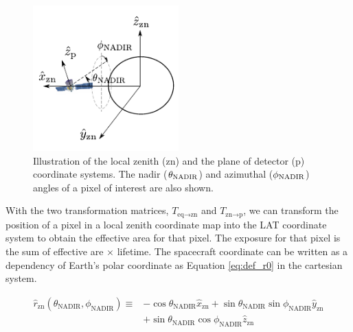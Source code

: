 \begin{figure}[h!]
    \centering
    \includegraphics[width=0.5\textwidth]{content/methodology/figures/fig_coordinate/coord_eq_p_v3.pdf}
    \caption{
        Illustration of the local zenith (zn) and the plane of detector
        (p) coordinate systems. The nadir ($\theta_{\rm NADIR}$)
        and azimuthal ($\phi_{\rm NADIR}$) angles of a pixel of
        interest are also shown.
    }
    \label{fig:coord_eq_p}
\end{figure}


With the two transformation matrices,
$T_{\text{eq}\rightarrow\text{zn}}$
and $T_{\text{zn}\rightarrow\text{p}}$,
we can transform the position of a pixel in a local zenith
coordinate map into the LAT coordinate system to obtain
the effective area for that pixel. The exposure for that
pixel is the sum of effective are $\times$ lifetime.
The spacecraft coordinate can be 
written as a dependency of Earth's polar coordinate as Equation \ref{eq:def_r0}
in the cartesian system.

\begin{equation*}
\begin{split}
    \hat{r}_\text{zn} (\theta_\text{NADIR}, \phi_\text{NADIR}) \equiv & -\cos\theta_\text{NADIR}\hat{x}_\text{zn} + \sin\theta_\text{NADIR}\sin\phi_\text{NADIR}\hat{y}_\text{zn} \\
    & + \sin\theta_\text{NADIR}\cos\phi_\text{NADIR}\hat{z}_\text{zn}
\end{split}
\label{eq:def_r0}
\end{equation*}

